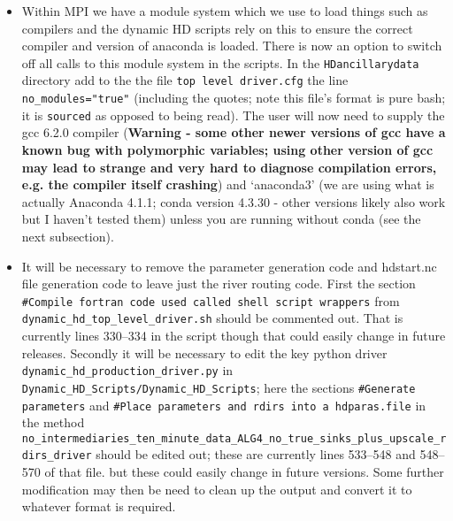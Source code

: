 \documentclass{article}
\begin{document}
\begin{itemize}
\begin{itemize}
\end{itemize}
\item Within MPI we have a module system which we use to load things such as compilers and the dynamic HD scripts rely on this to ensure the correct compiler and version of anaconda is loaded. There is now an option to switch off all calls to this module system in the scripts. In the \lstinline[style=bash_input]{HDancillarydata} directory add to the the file  \lstinline[style=bash_input]{top level driver.cfg} the line \lstinline[style=bash_input]{no_modules="true"}  (including the quotes; note this file's format is pure bash; it is \lstinline[style=bash_input]{sourced} as opposed to being read). The user will now need to supply the gcc 6.2.0 compiler (\textbf{Warning - some other newer versions of gcc have a known bug with polymorphic variables; using other version of gcc may lead to strange  and very hard to diagnose compilation errors, e.g. the compiler itself crashing}) and `anaconda3' (we are using what is actually Anaconda 4.1.1; conda version 4.3.30 - other versions likely also work but I haven't tested them) unless you are running without conda (see the next subsection).
\item It will be necessary to remove the parameter generation code and hdstart.nc file generation code to leave just the river routing code. First the section \\  \lstinline[style=bash_input]{#Compile fortran code used called shell script wrappers} from \lstinline[style=bash_input]{dynamic_hd_top_level_driver.sh} should be commented out. That is currently lines 330--334 in the script though that could easily change in future releases. Secondly it will be necessary to edit the key python driver \lstinline[style=bash_input]{dynamic_hd_production_driver.py} in \lstinline[style=bash_input]{Dynamic_HD_Scripts/Dynamic_HD_Scripts}; here the sections \lstinline[style=bash_input]{#Generate parameters} and \lstinline[style=bash_input]{#Place parameters and rdirs into a hdparas.file} in the method \lstinline[style=bash_input]{no_intermediaries_ten_minute_data_ALG4_no_true_sinks_plus_upscale_rdirs_driver} should be edited out; these are currently lines 533--548 and 548--570 of that file. but these could easily change in future versions. Some further modification may then be need to clean up the output and convert it to whatever format is required.

\end{itemize}
\end{document}
